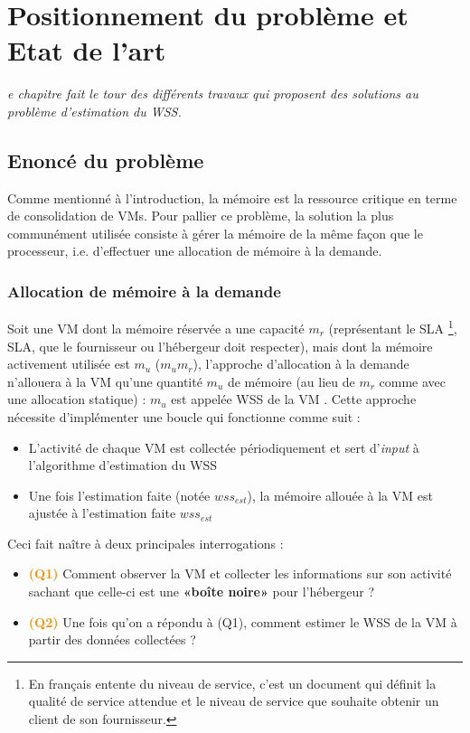 \let\textcircled=\pgftextcircled
\chapter{Positionnement du problème et Etat de l'art}
\label{chap:etat_de_lart}

\textit{e chapitre fait le tour des différents travaux qui proposent des solutions au problème d'estimation du WSS.}

\minitoc

\newpage    
\section{Enoncé du problème}
Comme mentionné à l'introduction, la mémoire est la ressource critique en terme de consolidation de VMs. Pour pallier ce problème, la solution la plus communément utilisée consiste à gérer la mémoire de la même façon que le processeur, i.e. d'effectuer une allocation de mémoire à la demande. 

\subsection{Allocation de mémoire à la demande}
Soit une VM dont la mémoire réservée a une capacité $\textit{m}_\textit{r}$ (représentant le \acs{SLA} \footnote{En français entente du niveau de service, c'est un document qui définit la qualité de service attendue et le niveau de service que souhaite obtenir un client de son fournisseur.}, \acl{SLA}, que le fournisseur ou l'hébergeur doit respecter), mais dont la mémoire activement utilisée est $\textit{m}_\textit{u}$ ($\textit{m}_\textit{u}$\leq $\textit{m}_\textit{r}$), l'approche d'allocation à la demande n'allouera à la VM qu'une quantité $\textit{m}_\textit{u}$ de mémoire (au lieu de $\textit{m}_\textit{r}$ comme avec une allocation statique) : $\textit{m}_\textit{u}$ est appelée \ac{WSS} de la VM \cite{article9}. Cette approche nécessite d'implémenter une boucle qui fonctionne comme suit :
\begin{itemize}
    \item L'activité de chaque VM est collectée périodiquement et sert d'\textit{input} à l'algorithme d'estimation du WSS
    \item Une fois l'estimation faite (notée $\textit{wss}_\textit{est}$), la mémoire allouée à la VM est ajustée à l'estimation faite $\textit{wss}_\textit{est}$
\end{itemize}
Ceci fait naître à deux principales interrogations : 
\begin{itemize}[label=, font=\large \color{darkorange}]
    \item \textbf{\large{\textcolor{darkorange}{(Q1)}}} Comment observer la VM et collecter les informations sur son activité sachant que celle-ci est une \textbf{«boîte noire»} pour l'hébergeur ?\\
    \item \textbf{\large{\textcolor{darkorange}{(Q2)}}} Une fois qu'on a répondu à (Q1), comment estimer le WSS de la VM à partir des données collectées ? \\
\end{itemize}
\par\noindent

